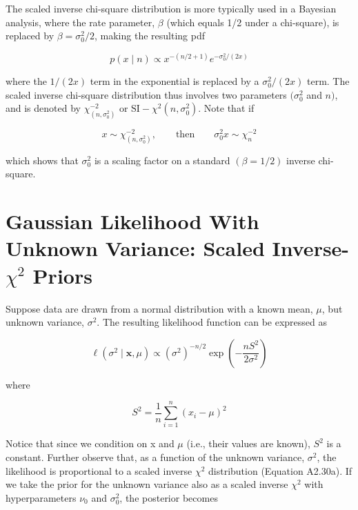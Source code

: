 \documentclass{article}
\begin{document}
The scaled inverse chi-square distribution is more typically used in a Bayesian analysis, where the rate parameter,  $ \beta $ (which equals 1/2 under a chi-square), is replaced by  $ \beta = \sigma_{0}^{2}/2 $, making the resulting pdf

\begin{equation}
p(x\mid n)\propto x^{-(n/2+1)}e^{-\sigma_{0}^{2}/(2x)}
\end{equation}

where the  $ 1/(2x) $ term in the exponential is replaced by a  $ \sigma_0^2/(2x) $ term. The scaled inverse chi-square distribution thus involves two parameters  $ (\sigma_0^2 $ and  $ n) $, and is denoted by  $ \chi_{(n,\sigma_0^2)}^{-2} $ or  $ \mathrm{SI}-\chi^2(n,\sigma_0^2) $. Note that if

\begin{equation}
x\sim\chi_{(n,\sigma_{0}^{2})}^{-2},\qquad\mathrm{t h e n}\qquad\sigma_{0}^{2}x\sim\chi_{n}^{-2}
\end{equation}

which shows that  $ \sigma_{0}^{2} $ is a scaling factor on a standard  $ (\beta = 1/2) $ inverse chi-square.

\section{Gaussian Likelihood With Unknown Variance: Scaled Inverse- $ \chi^{2} $ Priors}
Suppose data are drawn from a normal distribution with a known mean,  $ \mu $, but unknown variance,  $ \sigma^{2} $. The resulting likelihood function can be expressed as

\begin{equation}
\ell(\sigma^{2}\mid\mathbf{x},\mu)\propto(\sigma^{2})^{-n/2}\exp\left(-\frac{nS^{2}}{2\sigma^{2}}\right)
\end{equation}

where

\begin{equation}
S^{2}=\frac{1}{n}\sum_{i=1}^{n}\left(x_{i}-\mu\right)^{2}
\end{equation}

Notice that since we condition on x and  $ \mu $ (i.e., their values are known),  $ S^2 $ is a constant. Further observe that, as a function of the unknown variance,  $ \sigma^2 $, the likelihood is proportional to a scaled inverse  $ \chi^2 $ distribution (Equation A2.30a). If we take the prior for the unknown variance also as a scaled inverse  $ \chi^2 $ with hyperparameters  $ \nu_0 $ and  $ \sigma_0^2 $, the posterior becomes
\end{document}
